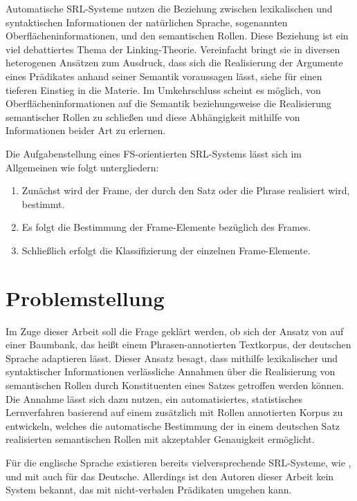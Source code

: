 \documentclass[12pt]{article}
\begin{document}
Automatische SRL-Systeme nutzen die Beziehung zwischen lexikalischen und syntaktischen Informationen der natürlichen Sprache, sogenannten Oberflächeninformationen, und den semantischen Rollen. Diese Beziehung ist ein viel debattiertes Thema der Linking-Theorie. Vereinfacht bringt sie in diversen heterogenen Ansätzen zum Ausdruck, dass sich die Realisierung der Argumente eines Prädikates anhand seiner Semantik voraussagen lässt, siehe \cite{levinrappaport} für einen tieferen Einstieg in die Materie. Im Umkehrschluss scheint es möglich, von Oberflächeninformationen auf die Semantik beziehungsweise die Realisierung semantischer Rollen zu schließen und diese Abhängigkeit mithilfe von Informationen beider Art zu erlernen.\citep{gildea}

Die Aufgabenstellung eines FS-orientierten SRL-Systems lässt sich im Allgemeinen
wie folgt untergliedern:
\begin{enumerate}
\item Zunächst wird der Frame, der durch den Satz oder die Phrase realisiert wird, bestimmt.
\item Es folgt die Bestimmung der Frame-Elemente bezüglich des Frames. 
\item Schließlich erfolgt die Klassifizierung der einzelnen Frame-Elemente.
\end{enumerate}

\section{Problemstellung}

Im Zuge dieser Arbeit soll die Frage geklärt werden, ob sich der Ansatz von \cite{gildea} auf einer Baumbank, das heißt einem Phrasen-annotierten Textkorpus, der deutschen Sprache adaptieren lässt. Dieser Ansatz besagt, dass mithilfe lexikalischer und syntaktischer Informationen verlässliche Annahmen über die Realisierung von semantischen Rollen durch Konstituenten eines Satzes getroffen werden können. Die Annahme lässt sich dazu nutzen, ein automatisiertes, statistisches Lernverfahren basierend auf einem zusätzlich mit Rollen annotierten Korpus zu entwickeln, welches die automatische Bestimmung der in einem deutschen Satz realisierten semantischen Rollen mit akzeptabler Genauigkeit ermöglicht.

Für die englische Sprache existieren bereits vielversprechende SRL-Systeme, wie \cite{das_semafor_2010, johansson_lth_2007, gildea}, und mit \cite{erk2006shalmaneser} auch für das Deutsche. Allerdings ist den Autoren dieser Arbeit kein System bekannt, das mit nicht-verbalen Prädikaten umgehen kann.
\end{document}
